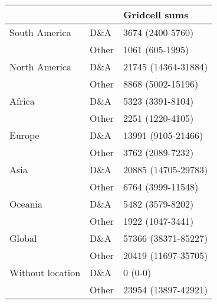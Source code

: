 \begin{tabular}{ll p{1.5cm}}
\toprule
                 &       &               Gridcell sums \\
\midrule
South America & D\&A &     3674 \mbox{(2400-5760)} \\
                 & Other &      1061 \mbox{(605-1995)} \\
North America & D\&A &  21745 \mbox{(14364-31884)} \\
                 & Other &    8868 \mbox{(5002-15196)} \\
Africa & D\&A &     5323 \mbox{(3391-8104)} \\
                 & Other &     2251 \mbox{(1220-4105)} \\
Europe & D\&A &   13991 \mbox{(9105-21466)} \\
                 & Other &     3762 \mbox{(2089-7232)} \\
Asia & D\&A &  20885 \mbox{(14705-29783)} \\
                 & Other &    6764 \mbox{(3999-11548)} \\
Oceania & D\&A &     5482 \mbox{(3579-8202)} \\
                 & Other &     1922 \mbox{(1047-3441)} \\
Global & D\&A &  57366 \mbox{(38371-85227)} \\
                 & Other &  20419 \mbox{(11697-35705)} \\
Without location & D\&A &              0 \mbox{(0-0)} \\
                 & Other &  23954 \mbox{(13897-42921)} \\
\bottomrule
\end{tabular}

